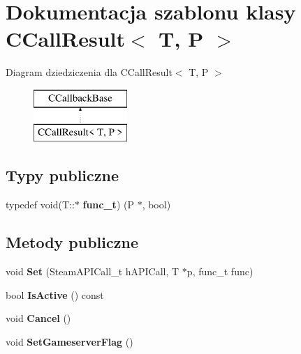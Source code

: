 \hypertarget{class_c_call_result}{}\section{Dokumentacja szablonu klasy C\+Call\+Result$<$ T, P $>$}
\label{class_c_call_result}
Diagram dziedziczenia dla C\+Call\+Result$<$ T, P $>$\begin{figure}[H]
\begin{center}
\leavevmode
\includegraphics[height=2.000000cm]{class_c_call_result}
\end{center}
\end{figure}
\subsection*{Typy publiczne}
\begin{DoxyCompactItemize}
\item 
\mbox{\label{class_c_call_result_a41b25d59668e6a7dc6e339914f1b7c85}} 
typedef void(T\+::$\ast$ {\bfseries func\+\_\+t}) (P $\ast$, bool)
\end{DoxyCompactItemize}
\subsection*{Metody publiczne}
\begin{DoxyCompactItemize}
\item 
\mbox{\label{class_c_call_result_add408b4deb269334731a9a158bb4a514}} 
void {\bfseries Set} (Steam\+A\+P\+I\+Call\+\_\+t h\+A\+P\+I\+Call, T $\ast$p, func\+\_\+t func)
\item 
\mbox{\label{class_c_call_result_adefe9c0bce1c29affde48b12a308539f}} 
bool {\bfseries Is\+Active} () const
\item 
\mbox{\label{class_c_call_result_a5ba0d59380bd9d81f73b4e17fbd3c0f1}} 
void {\bfseries Cancel} ()
\item 
\mbox{\label{class_c_call_result_a96c54ba74e77413dba916cd871d942a6}} 
void {\bfseries Set\+Gameserver\+Flag} ()
\end{DoxyCompactItemize}


